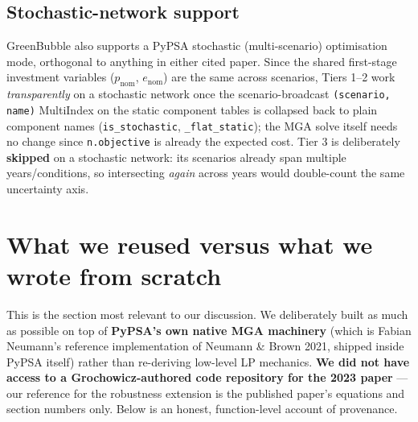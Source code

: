 \documentclass[11pt]{article}
\begin{document}
\subsection{Stochastic-network support}
GreenBubble also supports a PyPSA stochastic (multi-scenario) optimisation
mode, orthogonal to anything in either cited paper. Since the shared
first-stage investment variables ($p_{\mathrm{nom}}$, $e_{\mathrm{nom}}$)
are the same across scenarios, Tiers 1--2 work \emph{transparently} on a
stochastic network once the scenario-broadcast \texttt{(scenario, name)}
MultiIndex on the static component tables is collapsed back to plain
component names (\texttt{is\_stochastic}, \texttt{\_flat\_static}); the MGA
solve itself needs no change since \texttt{n.objective} is already the
expected cost. Tier 3 is deliberately \textbf{skipped} on a stochastic
network: its scenarios already span multiple years/conditions, so
intersecting \emph{again} across years would double-count the same
uncertainty axis.

\section{What we reused versus what we wrote from scratch}
\label{sec:provenance}
This is the section most relevant to our discussion. We deliberately built
as much as possible on top of \textbf{PyPSA's own native MGA machinery}
(which is Fabian Neumann's reference implementation of Neumann \& Brown
2021, shipped inside PyPSA itself) rather than re-deriving low-level LP
mechanics. \textbf{We did not have access to a Grochowicz-authored code
repository for the 2023 paper} --- our reference for the robustness
extension is the published paper's equations and section numbers only.
Below is an honest, function-level account of provenance.
\end{document}
